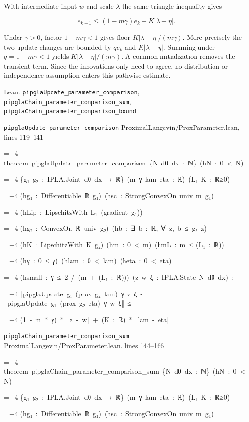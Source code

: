 \documentclass[11pt,a4paper]{report}
\newlength{\leancharwidth}
\newenvironment{leancode}{\par\smallskip\begingroup\ttfamily\footnotesize\raggedright
  \settowidth{\leancharwidth}{M}\setlength{\parskip}{0pt}\setlength{\parindent}{0pt}
  \frenchspacing}{\par\endgroup\smallskip}
\newcommand{\leanline}[2]{\hangindent=\dimexpr#1\leancharwidth+4\leancharwidth\relax
  \hangafter=1\noindent\hspace*{#1\leancharwidth}#2\par}
\newcommand{\leansource}[1]{\par{\footnotesize\color{leanmuted}#1}\par}
\begin{document}
With intermediate input \(w\) and scale \(\lambda\) the same triangle inequality gives

\[e_{k+1}\le(1-m\gamma)e_k+K|\lambda-\eta|.\]

Under \(\gamma>0\), factor \(1-m\gamma<1\) gives floor \(K|\lambda-\eta|/(m\gamma)\). More precisely the two update changes are bounded by \(q e_k\) and \(K|\lambda-\eta|\). Summing under \(q=1-m\gamma<1\) yields \(K|\lambda-\eta|/(m\gamma)\). A common initialization removes the transient term. Since the innovations only need to agree, no distribution or independence assumption enters this pathwise estimate.

\begin{leanbox}{Lean: \texttt{pipglaUpdate\_\allowbreak{}parameter\_\allowbreak{}comparison}, \texttt{pipglaChain\_\allowbreak{}parameter\_\allowbreak{}comparison\_\allowbreak{}sum}, \texttt{pipglaChain\_\allowbreak{}parameter\_\allowbreak{}comparison\_\allowbreak{}bound}}
\leansource{\texttt{pipglaUpdate\_\allowbreak{}parameter\_\allowbreak{}comparison} \quad ProximalLangevin/\allowbreak{}ProxParameter.lean, lines 119–141}
\begin{leancode}
\leanline{0}{theorem\ pipglaUpdate\_parameter\_comparison\ \{N\ dθ\ dx\ :\ ℕ\}\ (hN\ :\ 0\ <\ N)}
\leanline{4}{\{g₁\ g₂\ :\ IPLA.Joint\ dθ\ dx\ →\ ℝ\}\ (m\ γ\ lam\ eta\ :\ ℝ)\ (L₁\ K\ :\ ℝ≥0)}
\leanline{4}{(hg₁\ :\ Differentiable\ ℝ\ g₁)\ (hsc\ :\ StrongConvexOn\ univ\ m\ g₁)}
\leanline{4}{(hLip\ :\ LipschitzWith\ L₁\ (gradient\ g₁))}
\leanline{4}{(hg₂\ :\ ConvexOn\ ℝ\ univ\ g₂)\ (hb\ :\ ∃\ b\ :\ ℝ,\ ∀\ z,\ b\ ≤\ g₂\ z)}
\leanline{4}{(hK\ :\ LipschitzWith\ K\ g₂)\ (hm\ :\ 0\ <\ m)\ (hmL\ :\ m\ ≤\ (L₁\ :\ ℝ))}
\leanline{4}{(hγ\ :\ 0\ ≤\ γ)\ (hlam\ :\ 0\ <\ lam)\ (heta\ :\ 0\ <\ eta)}
\leanline{4}{(hsmall\ :\ γ\ ≤\ 2\ /\ (m\ +\ (L₁\ :\ ℝ)))\ (z\ w\ ξ\ :\ IPLA.State\ N\ dθ\ dx)\ :}
\leanline{4}{‖pipglaUpdate\ g₁\ (prox\ g₂\ lam)\ γ\ z\ ξ\ -\ pipglaUpdate\ g₁\ (prox\ g₂\ eta)\ γ\ w\ ξ‖\ ≤}
\leanline{6}{(1\ -\ m\ *\ γ)\ *\ ‖z\ -\ w‖\ +\ (K\ :\ ℝ)\ *\ |lam\ -\ eta|}
\end{leancode}
\leansource{\texttt{pipglaChain\_\allowbreak{}parameter\_\allowbreak{}comparison\_\allowbreak{}sum} \quad ProximalLangevin/\allowbreak{}ProxParameter.lean, lines 144–166}
\begin{leancode}
\leanline{0}{theorem\ pipglaChain\_parameter\_comparison\_sum\ \{N\ dθ\ dx\ :\ ℕ\}\ (hN\ :\ 0\ <\ N)}
\leanline{4}{\{g₁\ g₂\ :\ IPLA.Joint\ dθ\ dx\ →\ ℝ\}\ (m\ γ\ lam\ eta\ :\ ℝ)\ (L₁\ K\ :\ ℝ≥0)}
\leanline{4}{(hg₁\ :\ Differentiable\ ℝ\ g₁)\ (hsc\ :\ StrongConvexOn\ univ\ m\ g₁)}

\end{leancode}
\end{leanbox}
\end{document}
